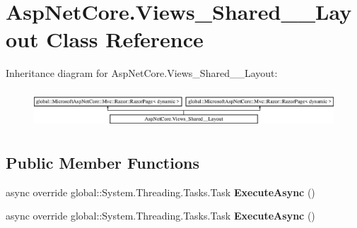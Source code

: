 \hypertarget{class_asp_net_core_1_1_views___shared_____layout}{}\section{Asp\+Net\+Core.\+Views\+\_\+\+Shared\+\_\+\+\_\+\+Layout Class Reference}
\label{class_asp_net_core_1_1_views___shared_____layout}
Inheritance diagram for Asp\+Net\+Core.\+Views\+\_\+\+Shared\+\_\+\+\_\+\+Layout\+:\begin{figure}[H]
\begin{center}
\leavevmode
\includegraphics[height=1.432225cm]{class_asp_net_core_1_1_views___shared_____layout}
\end{center}
\end{figure}
\subsection*{Public Member Functions}
\begin{DoxyCompactItemize}
\item 
\mbox{\label{class_asp_net_core_1_1_views___shared_____layout_ab6d0133c47f42aa6e823d599891346cc}} 
async override global\+::\+System.\+Threading.\+Tasks.\+Task {\bfseries Execute\+Async} ()
\item 
\mbox{\label{class_asp_net_core_1_1_views___shared_____layout_ab6d0133c47f42aa6e823d599891346cc}} 
async override global\+::\+System.\+Threading.\+Tasks.\+Task {\bfseries Execute\+Async} ()
\end{DoxyCompactItemize}
